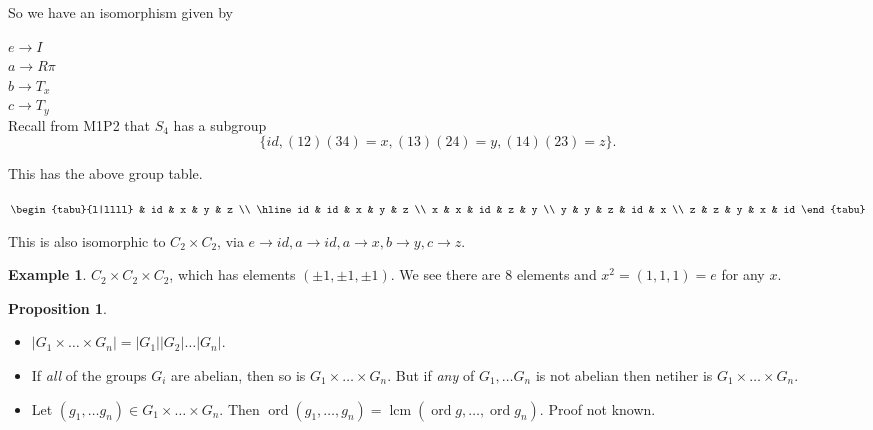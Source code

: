 \documentclass{article}
\theoremstyle{definition}
\newtheorem{proposition}{Proposition}
\newtheorem*{exmp}{Example}
\DeclareMathOperator{\lcm}{lcm}
\DeclareMathOperator{\ord}{\text{ord}}
\begin{document}
So we have an isomorphism given by

$e \rightarrow I$\\
$a \rightarrow R\pi$\\
$b \rightarrow T_x$\\
$c \rightarrow T_y$\\

Recall from M1P2 that $S_4$ has a subgroup $$\{id,  (12)(34)=x, (13)(24)=y, (14)(23)=z\}.$$

This has the above group table.
\begin{table}[!ht]
\centering
$\begin{tabu}{l|llll}
   & id & x  & y  & z \\
   \hline
id & id & x  & y  & z \\
x  & x  & id & z  & y \\
y  & y  & z  & id & x \\
z  & z  & y  & x  & id 
\end{tabu}$
\end{table}

This is also isomorphic to $C_2 \times C_2$, via $e \rightarrow id, a \rightarrow id, a \rightarrow x, b \rightarrow y, c \rightarrow z$.\\

\begin{exmp}
  
$C_2 \times C_2 \times C_2$, which has elements $(\pm 1, \pm 1, \pm 1)$. We see there are 8 elements and $x^2=(1,1,1)=e$ for any $x$.\\
\end{exmp}

\begin{proposition}\hfill
  \label{prp:ordgroup}
\begin{itemize}
  \item $|G_1 \times \ldots \times G_n| =|G_1||G_2|\ldots|G_n|.$
\item If \emph{all} of the groups $G_i$ are abelian, then so is $G_1 \times \ldots \times G_n$. But if \emph{any} of $G_1, \ldots G_n$ is not abelian then netiher is $G_1 \times \ldots \times G_n$.
\item Let $(g_1, \ldots g_n) \in G_1 \times \ldots \times G_n$. Then $\ord (g_1, \ldots , g_n) = \lcm (\ord g, \ldots , \ord g_n)$.
Proof not known.
\end{itemize}
\end{proposition}
\end{document}
